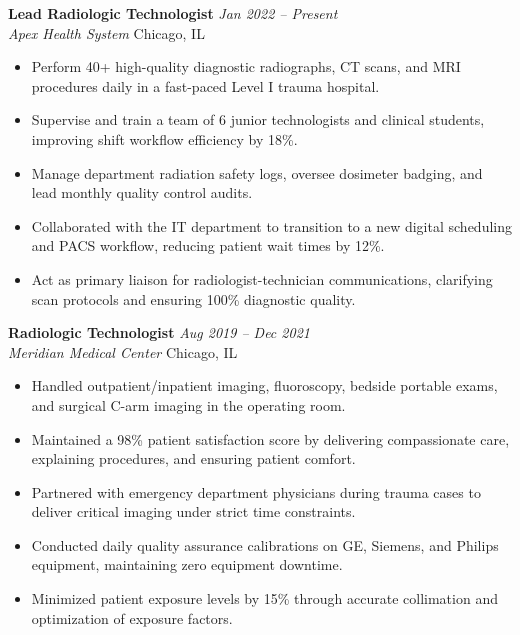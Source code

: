 \documentclass[10pt,letterpaper]{article}
\newcommand{\jobentry}[4]{%
  \noindent\textbf{\color{charcoal}#1} \hfill \textit{\color{slate}#2} \\
  \noindent\textit{\color{brandblue}#3} \hfill \color{slate}#4 \par
  \vspace{0.2em}
}
\begin{document}
\jobentry{Lead Radiologic Technologist}{Jan 2022 -- Present}{Apex Health System}{Chicago, IL}
\begin{itemize}[leftmargin=*,noitemsep,topsep=1pt,parsep=1pt,partopsep=0pt]
  \item Perform 40+ high-quality diagnostic radiographs, CT scans, and MRI procedures daily in a fast-paced Level I trauma hospital.
  \item Supervise and train a team of 6 junior technologists and clinical students, improving shift workflow efficiency by 18\%.
  \item Manage department radiation safety logs, oversee dosimeter badging, and lead monthly quality control audits.
  \item Collaborated with the IT department to transition to a new digital scheduling and PACS workflow, reducing patient wait times by 12\%.
  \item Act as primary liaison for radiologist-technician communications, clarifying scan protocols and ensuring 100\% diagnostic quality.
\end{itemize}

\vspace{0.6em}

\jobentry{Radiologic Technologist}{Aug 2019 -- Dec 2021}{Meridian Medical Center}{Chicago, IL}
\begin{itemize}[leftmargin=*,noitemsep,topsep=1pt,parsep=1pt,partopsep=0pt]
  \item Handled outpatient/inpatient imaging, fluoroscopy, bedside portable exams, and surgical C-arm imaging in the operating room.
  \item Maintained a 98\% patient satisfaction score by delivering compassionate care, explaining procedures, and ensuring patient comfort.
  \item Partnered with emergency department physicians during trauma cases to deliver critical imaging under strict time constraints.
  \item Conducted daily quality assurance calibrations on GE, Siemens, and Philips equipment, maintaining zero equipment downtime.
  \item Minimized patient exposure levels by 15\% through accurate collimation and optimization of exposure factors.
\end{itemize}

\vspace{0.4em}
\end{document}
